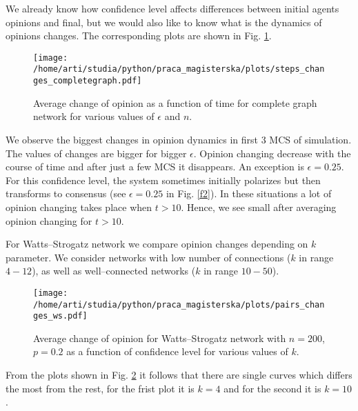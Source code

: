 \documentclass[a4paper, 12pt]{article}
\begin{document}
\indent

We already know how confidence level affects differences between initial agents opinions and final, but we would also like to know what is the dynamics of opinions changes. The corresponding plots are shown in Fig. \ref{f16}.

\begin{figure}[H]
		\centering
		\texttt{[image: /home/arti/studia/python/praca\_magisterska/plots/steps\_changes\_completegraph.pdf]}
		\caption{Average change of opinion as a function of time for complete graph network for various values of $\epsilon$ and $n$.}
		\label{f16}
\end{figure}

We observe the biggest changes in opinion dynamics in first 3 MCS of simulation. The values of changes are bigger for bigger $\epsilon$. Opinion changing decrease with the course of time and after just a few MCS it disappears. An exception is $\epsilon=0.25$. For this confidence level, the system sometimes initially polarizes but then transforms to consensus (see $\epsilon=0.25$ in Fig. \ref{f2}). In these situations a lot of opinion changing takes place when $t>10$. Hence, we see small after averaging opinion changing for $t>10$.

\indent

For Watts--Strogatz network we compare opinion changes depending on $k$ parameter. We consider networks with low number of connections ($k$ in range $4-12$), as well as well--connected networks ($k$ in range $10-50$).

\begin{figure}[H]
		\centering
		\texttt{[image: /home/arti/studia/python/praca\_magisterska/plots/pairs\_changes\_ws.pdf]}
		\caption{Average change of opinion for Watts--Strogatz network with $n=200$, $p=0.2$ as a function of confidence level for various values of $k$.}
		\label{f17}
\end{figure}

From the plots shown in Fig. \ref{f17} it follows that there are single curves which differs the most from the rest, for the frist plot it is $k=4$ and for the second it is $k=10$. 
\indent
\end{document}
